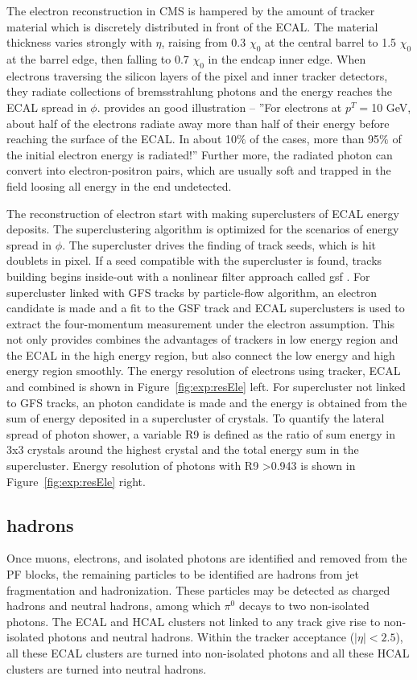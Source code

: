 The electron reconstruction in CMS is hampered by the amount of tracker material which is discretely distributed in front of the ECAL. The material thickness varies strongly with $\eta$, raising from 0.3 $\chi_0$ at the central barrel to 1.5 $\chi_0$ at the barrel edge, then falling to 0.7 $\chi_0$ in the endcap inner edge. When electrons traversing the silicon layers of the pixel and inner tracker detectors, they radiate collections of bremsstrahlung photons and the energy reaches the ECAL spread in $\phi$. \cite{cms:tdr1:Bayatian:2006nff} provides an good illustration -- ''For electrons at $p^T=$10 GeV, about half of the electrons radiate away more than half of their energy before reaching the surface of the ECAL. In about 10$\%$ of the cases, more than 95$\%$ of the initial electron energy is radiated!'' Further more, the radiated photon can convert into electron-positron pairs, which are usually soft and trapped in the field loosing all energy in the end undetected.

The reconstruction of electron start with making superclusters of ECAL energy deposits. The superclustering algorithm is optimized for the scenarios of energy spread in $\phi$. The supercluster drives the finding of track seeds, which is hit doublets in pixel. If a seed compatible with the supercluster is found, tracks building begins inside-out with a nonlinear filter approach called \acrfull{gsf} \cite{tech:gsf:Adam:2005bya}. For supercluster linked with GFS tracks by particle-flow algorithm, an electron candidate is made and a fit to the GSF track and ECAL superclusters is used to extract the four-momentum measurement under the electron assumption. This not only provides combines the advantages of trackers in low energy region and the ECAL in the high energy region, but also connect the low energy and high energy region smoothly. The energy resolution of electrons using tracker, ECAL and combined is shown in Figure~\ref{fig:exp:resEle} left. For supercluster not linked to GFS tracks, an photon candidate is made and the energy is obtained from the sum of energy deposited in a supercluster of crystals. To quantify the lateral spread of photon shower, a variable R9 is defined as the ratio of sum energy in 3x3 crystals around the highest crystal and the total energy sum in the supercluster. Energy resolution of photons with R9 >0.943 is shown in Figure~\ref{fig:exp:resEle} right.



\subsection{hadrons}
Once muons, electrons, and isolated photons are identified and removed from the PF blocks, the remaining particles to be identified are hadrons from jet fragmentation and hadronization. These particles may be detected as charged hadrons and neutral hadrons, among which $\pi^0$ decays to two non-isolated photons. The ECAL and HCAL clusters not linked to any track give rise to non-isolated photons and neutral hadrons. Within the tracker acceptance ($|\eta|< 2.5$), all these ECAL clusters are turned into non-isolated photons and all these HCAL clusters are turned into neutral hadrons. 

